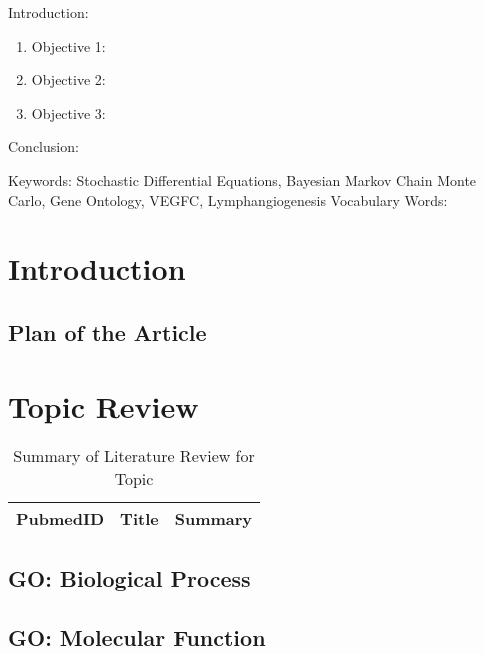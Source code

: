 

\twocolumn
\scriptsize
\begin{frontmatter}
		\title{}
		\author{}
		\address{The Mathematical Learning Space}
\end{frontmatter}	

Introduction:
\begin{enumerate}
\item Objective 1:
\item Objective 2:
\item Objective 3:
\end{enumerate}
Conclusion:

Keywords: Stochastic Differential Equations, Bayesian Markov Chain Monte Carlo, Gene Ontology, VEGFC, Lymphangiogenesis
Vocabulary Words:

\section{Introduction}

\subsection{Plan of the Article}


\section{Topic Review}

\begin{table}[H]
\centering
\begin{tabular}{r|p{12cm}|l}
\hline
PubmedID  & Title & Summary \\
\hline	
\hline
	\end{tabular}
	\caption{Summary of Literature Review for Topic}
\end{table}		

\subsection{GO: Biological Process}

\subsection{GO: Molecular Function}

